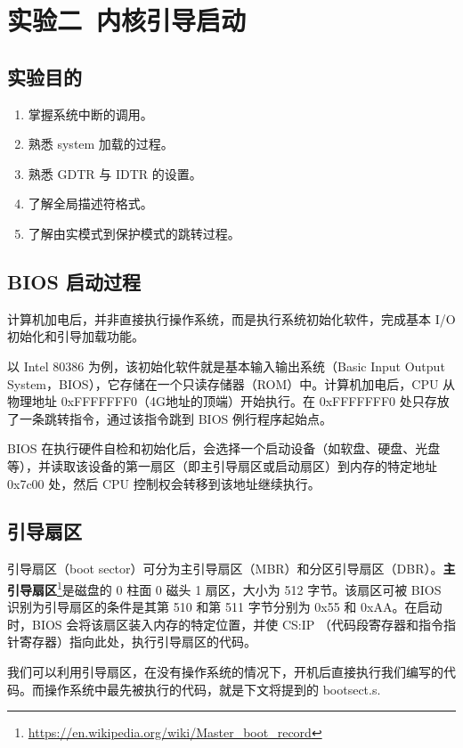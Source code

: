\section{实验二\ 内核引导启动}

\subsection{实验目的}

\begin{enumerate}
    \item 掌握系统中断的调用。
    \item 熟悉 system 加载的过程。
    \item 熟悉 GDTR 与 IDTR 的设置。
    \item 了解全局描述符格式。
    \item 了解由实模式到保护模式的跳转过程。
\end{enumerate}

\subsection{BIOS 启动过程}

计算机加电后，并非直接执行操作系统，而是执行系统初始化软件，完成基本 I/O 初始化和引导加载功能。

以 Intel 80386 为例，该初始化软件就是基本输入输出系统（Basic Input Output System，BIOS），它存储在一个只读存储器（ROM）中。计算机加电后，CPU 从物理地址 0xFFFFFFF0（4G地址的顶端）开始执行。在 0xFFFFFFF0 处只存放了一条跳转指令，通过该指令跳到 BIOS 例行程序起始点。

BIOS 在执行硬件自检和初始化后，会选择一个启动设备（如软盘、硬盘、光盘等），并读取该设备的第一扇区（即主引导扇区或启动扇区）到内存的特定地址 0x7c00 处，然后 CPU 控制权会转移到该地址继续执行。

\subsection{引导扇区}

引导扇区（boot sector）可分为主引导扇区（MBR）和分区引导扇区（DBR）。\textbf{主引导扇区}\footnote{\url{https://en.wikipedia.org/wiki/Master_boot_record}}是磁盘的 0 柱面 0 磁头 1 扇区，大小为 512 字节。该扇区可被 BIOS 识别为引导扇区的条件是其第 510 和第 511 字节分别为 0x55 和 0xAA。在启动时，BIOS 会将该扇区装入内存的特定位置，并使 CS:IP （代码段寄存器和指令指针寄存器）指向此处，执行引导扇区的代码。

我们可以利用引导扇区，在没有操作系统的情况下，开机后直接执行我们编写的代码。而操作系统中最先被执行的代码，就是下文将提到的 bootsect.s.

